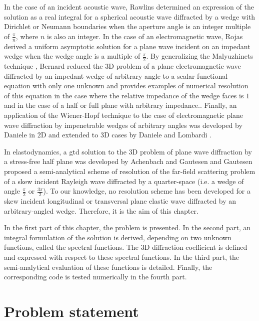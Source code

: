 In the case of an incident acoustic wave, Rawlins \cite{Rawlins} determined an expression of the solution as a real integral for a spherical acoustic wave diffracted by a wedge with Dirichlet or Neumann boundaries when the aperture angle is an integer multiple of $\frac{\pi}{n}$, where $n$ is also an integer. In the case of an electromagnetic wave, Rojas \cite{Rojas} derived a uniform asymptotic solution for a plane wave incident on an impedant wedge when the wedge angle is a multiple of $\frac{\pi}{2}$. By generalizing the Malyuzhinets technique \cite{SMtechnique}, Bernard \cite{Bernard} reduced the 3D problem of a plane electromagnetic wave diffracted by an impedant wedge of arbitrary angle to a scalar functional equation with only one unknown and provides examples of numerical resolution of this equation in the case where the relative impedance of the wedge faces is $1$ and in the case of a half or full plane with arbitrary impedance.. Finally, an application of the Wiener-Hopf technique to the case of electromagnetic plane wave diffraction by impenetrable wedges of arbitrary angles was developed by Daniele in 2D \cite{Daniele} and extended to 3D cases by Daniele and Lombardi \cite{DanieleLombardi}.

In elastodynamics, a \acrshort{gtd} solution to the 3D problem of plane wave diffraction by a stress-free half plane was developed by Achenbach and Gautesen \cite{Achenbach,AchenbachGautesen,GautesenNote} and Gautesen \cite{GautesenRayleigh4,GautesenRayleigh3} proposed a semi-analytical scheme of resolution of the far-field scattering problem of a skew incident Rayleigh wave diffracted by a quarter-space (i.e. a wedge of angle $\frac{\pi}{2}$ or $\frac{3\pi}{2}$). To our knowledge, no resolution scheme has been developed for a skew incident longitudinal or transversal plane elastic wave diffracted by an arbitrary-angled wedge. Therefore, it is the aim of this chapter.

In the first part of this chapter, the problem is presented. In the second part, an integral formulation of the solution is derived, depending on two unknown functions, called the spectral functions. The 3D diffraction coefficient is defined and expressed with respect to these spectral functions. In the third part, the semi-analytical evaluation of these functions is detailed. Finally, the corresponding code is tested numerically in the fourth part.
\section{Problem statement}

